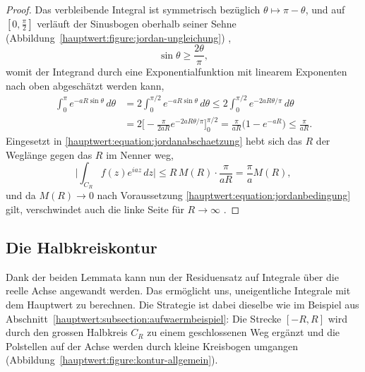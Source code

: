 \begin{proof}
  Das verbleibende Integral ist symmetrisch bezüglich
  $\theta \mapsto \pi - \theta$, und auf $[0,\frac{\pi}{2}]$ verläuft der
  Sinusbogen oberhalb seiner Sehne
  (Abbildung~\ref{hauptwert:figure:jordan-ungleichung})
  \cite[Abschnitt~81]{hauptwert:brown-churchill},
  \begin{equation}
    \sin\theta \ge \frac{2\theta}{\pi},
    \label{hauptwert:equation:jordanungleichung}
  \end{equation}
  womit der Integrand durch eine Exponentialfunktion mit linearem Exponenten
  nach oben abgeschätzt werden kann,
  \begin{equation}
  \begin{aligned}
    \int_{0}^{\pi} e^{-aR\sin\theta}\,d\theta
    &= 2 \int_{0}^{\pi/2} e^{-aR\sin\theta}\,d\theta
     \le 2 \int_{0}^{\pi/2} e^{-2aR\theta/\pi}\,d\theta \\
    &= 2 \biggl[
         -\frac{\pi}{2aR} e^{-2aR\theta/\pi}
       \biggr]_{0}^{\pi/2}
     = \frac{\pi}{aR}\bigl(1 - e^{-aR}\bigr)
     \le \frac{\pi}{aR}.
  \end{aligned}
  \end{equation}
  Eingesetzt in \eqref{hauptwert:equation:jordanabschaetzung} hebt sich das
  $R$ der Weglänge gegen das $R$ im Nenner weg,
  \begin{equation}
    \biggl| \int_{C_R} f(z) e^{iaz}\,dz \biggr|
    \le
    R\,M(R) \cdot \frac{\pi}{aR}
    =
    \frac{\pi}{a} M(R),
  \end{equation}
  und da $M(R) \to 0$ nach Voraussetzung
  \eqref{hauptwert:equation:jordanbedingung} gilt, verschwindet auch die
  linke Seite für $R \to \infty$
  \cite{hauptwert:qncubed3-jordan}.
\end{proof}


\subsection{Die Halbkreiskontur
\label{hauptwert:subsection:halbkreiskontur}}


Dank der beiden Lemmata kann nun der Residuensatz auf Integrale über die
reelle Achse angewandt werden.
Das ermöglicht uns, uneigentliche Integrale mit dem Hauptwert zu berechnen.
Die Strategie ist dabei dieselbe wie im
Beispiel aus Abschnitt~\ref{hauptwert:subsection:aufwaermbeispiel}:
Die Strecke $[-R, R]$ wird durch den grossen Halbkreis
$C_R$ zu einem geschlossenen Weg ergänzt und die Polstellen auf der
Achse werden durch kleine Kreisbogen umgangen
(Abbildung~\ref{hauptwert:figure:kontur-allgemein}).


